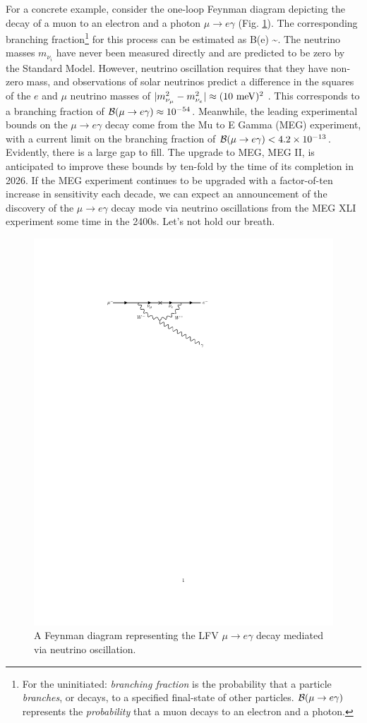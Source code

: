For a concrete example, consider the one-loop Feynman diagram depicting the decay of a muon to an electron and a photon $\mu \rightarrow e \gamma$ (Fig. \ref{fig:mu_e_gamma}). The corresponding branching fraction\footnote{For the uninitiated: {\it branching fraction} is the probability that a particle {\it branches}, or decays, to a specified final-state of other particles. ${\cal B}(\mu \rightarrow e\gamma)$ represents the {\it probability} that a muon decays to an electron and a photon.} for this process can be estimated as \cite{Bilenky:1977du}
\beq
    {\cal B}({\mu\rightarrow e\gamma}) \sim {}\frac{\alpha}{\pi}.
\eeq
The neutrino masses $m_{\nu_i}$ have never been measured directly and are predicted to be zero by the Standard Model. However, neutrino oscillation requires that they have non-zero mass, and observations of solar neutrinos predict a difference in the squares of the $e$ and $\mu$ neutrino masses of $| m_{\nu_\mu}^2-m_{\nu_e}^2| \approx (10~{\rm meV})^2$ \cite{ParticleDataGroup:2024cfk}. This corresponds to a branching fraction of ${\cal B}(\mu \rightarrow e\gamma) \approx 10^{-54}$. Meanwhile, the leading experimental bounds on the $\mu \rightarrow e\gamma$ decay come from the Mu to E Gamma (MEG) experiment, with a current limit on the branching fraction of ${\cal B}(\mu \rightarrow e\gamma) < 4.2\times 10^{-13}$. Evidently, there is a large gap to fill. The upgrade to MEG, MEG II, is anticipated to improve these bounds by ten-fold by the time of its completion in 2026. If the MEG experiment continues to be upgraded with a factor-of-ten increase in sensitivity each decade, we can expect an announcement of the discovery of the $\mu\rightarrow e\gamma$ decay mode via neutrino oscillations from the MEG XLI experiment some time in the 2400s. Let's not hold our breath.
\begin{figure}
    \centering
    \includegraphics[width=0.6\linewidth]{figures/chapter1/mu_e_gamma.pdf}
    \caption{A Feynman diagram representing the LFV $\mu \rightarrow e\gamma$ decay mediated via neutrino oscillation.}
    \label{fig:mu_e_gamma}
\end{figure}

